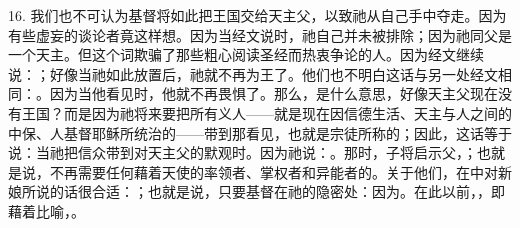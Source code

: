 16. 我们也不可认为基督将如此把王国交给天主父，以致祂从自己手中夺走。因为有些虚妄的谈论者竟这样想。因为当经文说时，祂自己并未被排除；因为祂同父是一个天主。但这个词欺骗了那些粗心阅读圣经而热衷争论的人。因为经文继续说：；好像当祂如此放置后，祂就不再为王了。他们也不明白这话与另一处经文相同：。因为当他看见时，他就不再畏惧了。那么，是什么意思，好像天主父现在没有王国？而是因为祂将来要把所有义人——就是现在因信德生活、天主与人之间的中保、人基督耶稣所统治的——带到那看见，也就是宗徒所称的；因此，这话等于说：当祂把信众带到对天主父的默观时。因为祂说：。那时，子将启示父，；也就是说，不再需要任何藉着天使的率领者、掌权者和异能者的。关于他们，在中对新娘所说的话很合适：；也就是说，只要基督在祂的隐密处：因为。在此以前，，即藉着比喻，。\par

